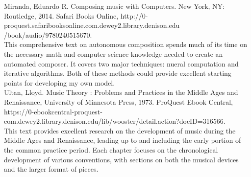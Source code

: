\documentclass[12pt]{article}
\begin{document}
\noindent \hangindent=0.7cm Miranda, Eduardo R. Composing music with Computers. New York, NY: Routledge, 2014. Safari Books Online, http://0-proquest.safaribooksonline.com.dewey2.library.denison.edu\\/book/audio/9780240515670.\\

This comprehensive text on autonomous composition spends much of its time on the necessary math and computer science knowledge needed to create an automated composer. It covers two major techniques: nueral computation and iterative algorithms. Both of these methods could provide excellent starting points for developing my own model.\\

\noindent \hangindent=0.7cm Ultan, Lloyd. Music Theory : Problems and Practices in the Middle Ages and Renaissance, University of Minnesota Press, 1973. ProQuest Ebook Central, https://0-ebookcentral-proquest-com.dewey2.library.denison.edu/lib/wooster/detail.action?docID=316566.\\

This text provides excellent research on the development of music during the Middle Ages and Renaissance, leading up to and including the early portion of the common practice period. Each chapter focuses on the chronological development of various conventions, with sections on both the musical devices and the larger format of pieces.
\end{document}
